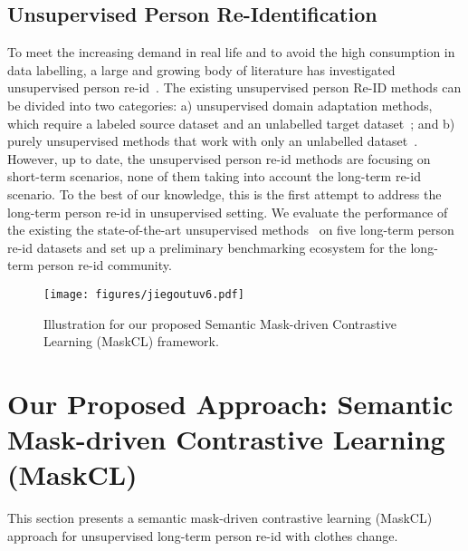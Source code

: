 \documentclass[10pt,twocolumn,letterpaper]{article}
\newcommand{\reid}{re-id}
\newcommand{\sota}{the state-of-the-art}
\begin{document}
\subsection{Unsupervised Person Re-Identification}
To meet the increasing demand in real life and to avoid the high consumption in data labelling, a large and growing body of literature has investigated unsupervised person re-id~\cite{Zheng:arXiv16,liu:CVPR19,Wang:CVPR18}.  
The existing unsupervised person Re-ID methods can be divided into two categories: a) unsupervised domain adaptation methods, which require a labeled source dataset and an unlabelled target dataset~\cite{liu:CVPR19,Bak:ECCV18,Peng:CVPR16,Wang:CVPR18}; and b) purely unsupervised methods that work with only an unlabelled dataset~\cite{TIPlmk,PPLR,ICE,dai:ACCV22}. 
However, up to date, the unsupervised person re-id methods are focusing on short-term scenarios, none of them taking into account the long-term re-id scenario. To the best of our knowledge, this is the first attempt to address the long-term person re-id in unsupervised setting. We evaluate the performance of the existing \sota{} unsupervised methods~\cite{Ge:NIPS20,TIPlmk,dai:ACCV22,lmkpr,PPLR,ICE} on five long-term person re-id datasets and set up a preliminary benchmarking ecosystem for the long-term person \reid{} community.












\begin{figure*}[!htb]
\begin{center}
\texttt{[image: figures/jiegoutuv6.pdf]}
\end{center}
\vspace{-5pt}
   \caption{Illustration for our proposed Semantic Mask-driven Contrastive Learning (MaskCL) framework.}
\label{fig:framework}
\vspace{-15pt}
\end{figure*}

\section{Our Proposed Approach: Semantic Mask-driven Contrastive Learning (MaskCL)}

This section presents a semantic mask-driven contrastive learning (MaskCL) approach for unsupervised long-term person re-id with clothes change. 
\end{document}

